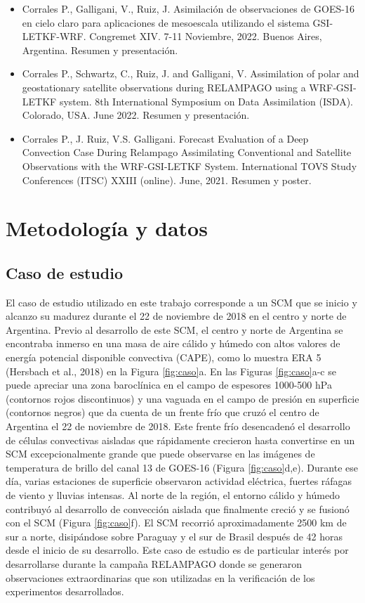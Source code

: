 \documentclass[12pt,oneside,a4paper]{reedthesis}
\providecommand{\tightlist}{%
  \setlength{\itemsep}{0pt}\setlength{\parskip}{0pt}}
\begin{document}
\begin{itemize}
\tightlist
\item
  Corrales P., Galligani, V., Ruiz, J. Asimilación de observaciones de GOES-16 en cielo claro para aplicaciones de mesoescala utilizando el sistema GSI-LETKF-WRF. Congremet XIV. 7-11 Noviembre, 2022. Buenos Aires, Argentina. Resumen y presentación.
\item
  Corrales P., Schwartz, C., Ruiz, J. and Galligani, V. Assimilation of polar and geostationary satellite observations during RELAMPAGO using a WRF‐GSI‐LETKF system. 8th International Symposium on Data Assimilation (ISDA). Colorado, USA. June 2022. Resumen y presentación.
\item
  Corrales P., J. Ruiz, V.S. Galligani. Forecast Evaluation of a Deep Convection Case During Relampago Assimilating Conventional and Satellite Observations with the WRF-GSI-LETKF System. International TOVS Study Conferences (ITSC) XXIII (online). June, 2021. Resumen y poster.
\end{itemize}
\hypertarget{metodologuxeda-y-datos}{%
\chapter{Metodología y datos}\label{metodologuxeda-y-datos}}

\hypertarget{caso-de-estudio}{%
\section{Caso de estudio}\label{caso-de-estudio}}

El caso de estudio utilizado en este trabajo corresponde a un SCM que se inicio y alcanzo su madurez durante el 22 de noviembre de 2018 en el centro y norte de Argentina. Previo al desarrollo de este SCM, el centro y norte de Argentina se encontraba inmerso en una masa de aire cálido y húmedo con altos valores de energía potencial disponible convectiva (CAPE), como lo muestra ERA 5 (Hersbach et al., 2018) en la Figura \ref{fig:caso}a. En las Figuras \ref{fig:caso}a-c se puede apreciar una zona baroclínica en el campo de espesores 1000-500 hPa (contornos rojos discontinuos) y una vaguada en el campo de presión en superficie (contornos negros) que da cuenta de un frente frío que cruzó el centro de Argentina el 22 de noviembre de 2018. Este frente frío desencadenó el desarrollo de células convectivas aisladas que rápidamente crecieron hasta convertirse en un SCM excepcionalmente grande que puede observarse en las imágenes de temperatura de brillo del canal 13 de GOES-16 (Figura \ref{fig:caso}d,e). Durante ese día, varias estaciones de superficie observaron actividad eléctrica, fuertes ráfagas de viento y lluvias intensas. Al norte de la región, el entorno cálido y húmedo contribuyó al desarrollo de convección aislada que finalmente creció y se fusionó con el SCM (Figura \ref{fig:caso}f). El SCM recorrió aproximadamente 2500 km de sur a norte, disipándose sobre Paraguay y el sur de Brasil después de 42 horas desde el inicio de su desarrollo. Este caso de estudio es de particular interés por desarrollarse durante la campaña RELAMPAGO donde se generaron observaciones extraordinarias que son utilizadas en la verificación de los experimentos desarrollados.
\end{document}
